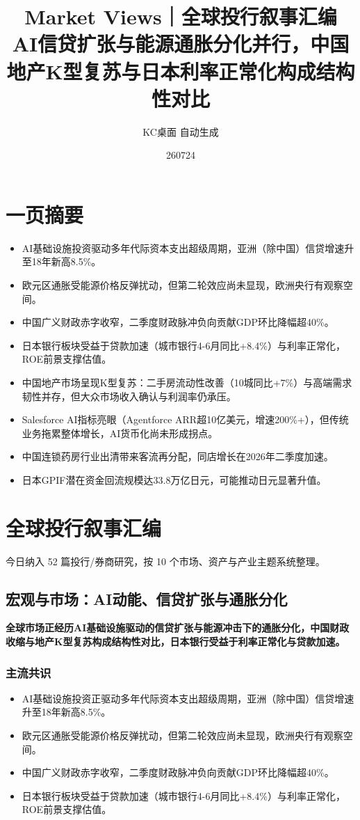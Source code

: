 \documentclass[11pt]{ctexart}
\title{\textbf{Market Views｜全球投行叙事汇编}\\[0.4em]{\large AI信贷扩张与能源通胀分化并行，中国地产K型复苏与日本利率正常化构成结构性对比}}
\author{KC桌面 自动生成}
\date{260724}
\begin{document}
\maketitle
\tableofcontents
\newpage
\section{一页摘要}
\begin{itemize}
  \item AI基础设施投资驱动多年代际资本支出超级周期，亚洲（除中国）信贷增速升至18年新高8.5\%。
  \item 欧元区通胀受能源价格反弹扰动，但第二轮效应尚未显现，欧洲央行有观察空间。
  \item 中国广义财政赤字收窄，二季度财政脉冲负向贡献GDP环比降幅超40\%。
  \item 日本银行板块受益于贷款加速（城市银行4-6月同比+8.4\%）与利率正常化，ROE前景支撑估值。
  \item 中国地产市场呈现K型复苏：二手房流动性改善（10城同比+7\%）与高端需求韧性并存，但大众市场收入确认与利润率仍承压。
  \item Salesforce AI指标亮眼（Agentforce ARR超10亿美元，增速200\%+），但传统业务拖累整体增长，AI货币化尚未形成拐点。
  \item 中国连锁药房行业出清带来客流再分配，同店增长在2026年二季度加速。
  \item 日本GPIF潜在资金回流规模达33.8万亿日元，可能推动日元显著升值。
\end{itemize}
\section{全球投行叙事汇编}
今日纳入 52 篇投行/券商研究，按 10 个市场、资产与产业主题系统整理。
\newpage
\subsection{宏观与市场：AI动能、信贷扩张与通胀分化}
\textbf{全球市场正经历AI基础设施驱动的信贷扩张与能源冲击下的通胀分化，中国财政收缩与地产K型复苏构成结构性对比，日本银行受益于利率正常化与贷款加速。}
\subsubsection*{主流共识}
\begin{itemize}
  \item AI基础设施投资正驱动多年代际资本支出超级周期，亚洲（除中国）信贷增速升至18年新高8.5\%。
  \item 欧元区通胀受能源价格反弹扰动，但第二轮效应尚未显现，欧洲央行有观察空间。
  \item 中国广义财政赤字收窄，二季度财政脉冲负向贡献GDP环比降幅超40\%。
  \item 日本银行板块受益于贷款加速（城市银行4-6月同比+8.4\%）与利率正常化，ROE前景支撑估值。
\end{itemize}
\end{document}
